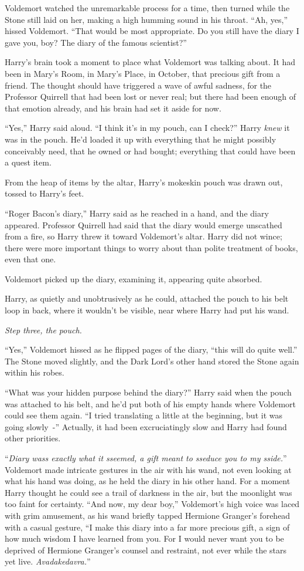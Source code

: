 Voldemort watched the unremarkable process for a time, then turned while the Stone still laid on her, making a high humming sound in his throat. ``Ah, yes,'' hissed Voldemort. ``That would be most appropriate. Do you still have the diary I gave you, boy? The diary of the famous scientist?''

Harry's brain took a moment to place what Voldemort was talking about. It had been in Mary's Room, in Mary's Place, in October, that precious gift from a friend. The thought should have triggered a wave of awful sadness, for the Professor Quirrell that had been lost or never real; but there had been enough of that emotion already, and his brain had set it aside for now.

``Yes,'' Harry said aloud. ``I think it's in my pouch, can I check?'' Harry \emph{knew} it was in the pouch. He'd loaded it up with everything that he might possibly conceivably need, that he owned or had bought; everything that could have been a quest item.

From the heap of items by the altar, Harry's mokeskin pouch was drawn out, tossed to Harry's feet.

``Roger Bacon's diary,'' Harry said as he reached in a hand, and the diary appeared. Professor Quirrell had said that the diary would emerge unscathed from a fire, so Harry threw it toward Voldemort's altar. Harry did not wince; there were more important things to worry about than polite treatment of books, even that one.

Voldemort picked up the diary, examining it, appearing quite absorbed.

Harry, as quietly and unobtrusively as he could, attached the pouch to his belt loop in back, where it wouldn't be visible, near where Harry had put his wand.

\emph{Step three, the pouch.}

``Yes,'' Voldemort hissed as he flipped pages of the diary, ``this will do quite well.'' The Stone moved slightly, and the Dark Lord's other hand stored the Stone again within his robes.

``What was your hidden purpose behind the diary?'' Harry said when the pouch was attached to his belt, and he'd put both of his empty hands where Voldemort could see them again. ``I tried translating a little at the beginning, but it was going slowly~-'' Actually, it had been excruciatingly slow and Harry had found other priorities.

``\emph{Diary wass exactly what it sseemed, a gift meant to sseduce you to my sside.}'' Voldemort made intricate gestures in the air with his wand, not even looking at what his hand was doing, as he held the diary in his other hand. For a moment Harry thought he could see a trail of darkness in the air, but the moonlight was too faint for certainty. ``And now, my dear boy,'' Voldemort's high voice was laced with grim amusement, as his wand briefly tapped Hermione Granger's forehead with a casual gesture, ``I make this diary into a far more precious gift, a sign of how much wisdom I have learned from you. For I would never want you to be deprived of Hermione Granger's counsel and restraint, not ever while the stars yet live. \emph{Avadakedavra.}''


